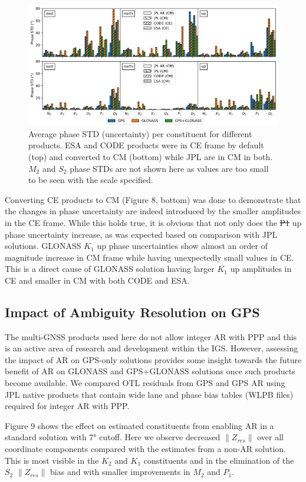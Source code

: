 \documentclass[se, manuscript]{copernicus}
\providecommand{\DIFadd}[1]{{\protect\color{blue}\uwave{#1}}} %
\providecommand{\DIFdel}[1]{{\protect\color{red}\sout{#1}}}                      %
\providecommand{\DIFaddbegin}{} %
\providecommand{\DIFaddend}{} %
\providecommand{\DIFdelbegin}{} %
\providecommand{\DIFdelend}{} %
\begin{document}
\begin{figure}[t]
\includegraphics[width=17cm]{fig08.png}
\caption{Average phase STD (uncertainty) per constituent for different products. ESA and CODE products were in CE frame by default (top) and converted to CM (bottom) while JPL are in CM in both. $M_2$ and $S_2$ phase STDs are not shown here as values are too small to be seen with the scale specified.}
\end{figure}
Converting CE products to CM (Figure 8, bottom) was done to demonstrate that the changes in phase uncertainty are indeed introduced by the smaller amplitudes in the CE frame. While this holds true, it is obvious that not only does the \DIFdelbegin \DIFdel{P1 }\DIFdelend \DIFaddbegin \DIFadd{$P_1$ }\DIFaddend up phase uncertainty increase, as was expected based on comparison with JPL solutions. GLONASS $K_1$ up phase uncertainties show almost an order of magnitude increase in CM frame while having unexpectedly small values in CE. This is a direct cause of GLONASS solution having larger $K_1$ up amplitudes in CE and smaller in CM with both CODE and ESA.

\subsection{Impact of Ambiguity Resolution on GPS}
The multi-GNSS products used here do not allow integer AR with PPP and this is an active area of research and development within the IGS. However, assessing the impact of AR on GPS-only solutions provides some insight towards the future benefit of AR on GLONASS and GPS+GLONASS solutions once such products become available. We compared OTL residuals from GPS and GPS AR using JPL native products that contain wide lane and phase bias tables (WLPB files) required for integer AR with PPP.

Figure 9 shows the effect on estimated constituents from enabling AR in a standard solution with 7° cutoff. Here we observe decreased $\|Z_{res}\|$ over all coordinate components compared with the estimates from a non-AR solution. This is most visible in the $K_2$ and $K_1$ constituents and in the elimination of the $S_2$ $\|Z_{res}\|$ bias and with smaller improvements in $M_2$ and $P_1$.
\end{document}
